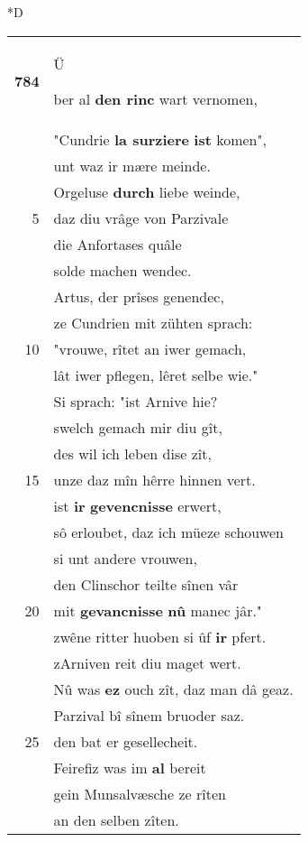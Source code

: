 \documentclass[8pt,a4paper,notitlepage]{article}
\begin{document}
\begin{table}[ht]
\begin{minipage}[t]{0.5\linewidth}
\small
\begin{center}*D
\end{center}
\begin{tabular}{rl}
\textbf{784} & \begin{large}Ü\end{large}ber al \textbf{den rinc} wart vernomen,\\ 
 & "Cundrie \textbf{la surziere} \textbf{ist} komen",\\ 
 & unt waz ir mære meinde.\\ 
 & Orgeluse \textbf{durch} liebe weinde,\\ 
5 & daz diu vrâge von Parzivale\\ 
 & die Anfortases quâle\\ 
 & solde machen wendec.\\ 
 & Artus, der prîses genendec,\\ 
 & ze Cundrien mit zühten sprach:\\ 
10 & "vrouwe, rîtet an iwer gemach,\\ 
 & lât iwer pflegen, lêret selbe wie."\\ 
 & Si sprach: "ist Arnive hie?\\ 
 & swelch gemach mir diu gît,\\ 
 & des wil ich leben dise zît,\\ 
15 & unze daz mîn hêrre hinnen vert.\\ 
 & ist \textbf{ir} \textbf{gevencnisse} erwert,\\ 
 & sô erloubet, daz ich müeze schouwen\\ 
 & si unt andere vrouwen,\\ 
 & den Clinschor teilte sînen vâr\\ 
20 & mit \textbf{gevancnisse} \textbf{nû} manec jâr."\\ 
 & zwêne ritter huoben si ûf \textbf{ir} pfert.\\ 
 & zArniven reit diu maget wert.\\ 
 & Nû was \textbf{ez} ouch zît, daz man dâ geaz.\\ 
 & Parzival bî sînem bruoder saz.\\ 
25 & den bat er gesellecheit.\\ 
 & Feirefiz was im \textbf{al} bereit\\ 
 & gein Munsalvæsche ze rîten\\ 
 & an den selben zîten.\\ 

\end{tabular}
\end{minipage}
\end{table}
\end{document}
